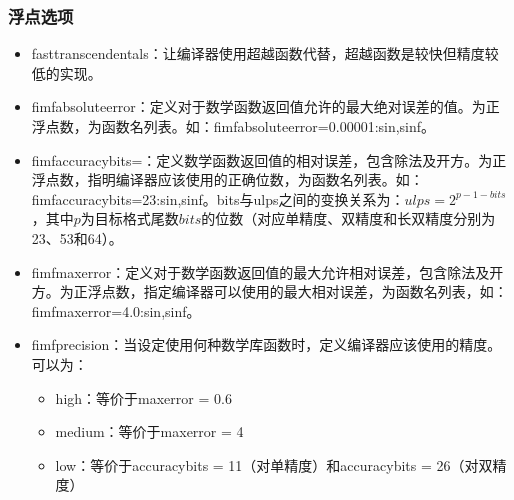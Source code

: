 \documentclass[a4paper,12pt,english]{sphinxmanual}
\begin{document}
\subsubsection{浮点选项}
\label{\detokenize{compiler/intel:id7}}\begin{itemize}
\item {} 
\sphinxAtStartPar
\sphinxhyphen{}fast\sphinxhyphen{}transcendentals：让编译器使用超越函数代替，超越函数是较快但精度较低的实现。

\item {} 
\sphinxAtStartPar
\sphinxhyphen{}fimf\sphinxhyphen{}absolute\sphinxhyphen{}error：定义对于数学函数返回值允许的最大绝对误差的值。为正浮点数，为函数名列表。如：\sphinxhyphen{}fimf\sphinxhyphen{}absolute\sphinxhyphen{}error=0.00001:sin,sinf。

\item {} 
\sphinxAtStartPar
\sphinxhyphen{}fimf\sphinxhyphen{}accuracy\sphinxhyphen{}bits=：定义数学函数返回值的相对误差，包含除法及开方。为正浮点数，指明编译器应该使用的正确位数，为函数名列表。如：\sphinxhyphen{}fimf\sphinxhyphen{}accuracy\sphinxhyphen{}bits=23:sin,sinf。bits与ulps之间的变换关系为：\(ulps=2^{p-1-bits}\)，其中\(p\)为目标格式尾数\(bits\)的位数（对应单精度、双精度和长双精度分别为23、53和64）。

\item {} 
\sphinxAtStartPar
\sphinxhyphen{}fimf\sphinxhyphen{}max\sphinxhyphen{}error：定义对于数学函数返回值的最大允许相对误差，包含除法及开方。为正浮点数，指定编译器可以使用的最大相对误差，为函数名列表，如：\sphinxhyphen{}fimf\sphinxhyphen{}max\sphinxhyphen{}error=4.0:sin,sinf。

\item {} 
\sphinxAtStartPar
\sphinxhyphen{}fimf\sphinxhyphen{}precision\sphinxstyleemphasis{{[}=value{[}:funclist{]}{]}}：当设定使用何种数学库函数时，定义编译器应该使用的精度。可以为：
\begin{itemize}
\item {} 
\sphinxAtStartPar
high：等价于max\sphinxhyphen{}error = 0.6

\item {} 
\sphinxAtStartPar
medium：等价于max\sphinxhyphen{}error = 4

\item {} 
\sphinxAtStartPar
low：等价于accuracy\sphinxhyphen{}bits = 11（对单精度）和accuracy\sphinxhyphen{}bits = 26（对双精度）


\end{itemize}
\end{itemize}
\end{document}
